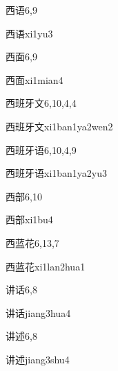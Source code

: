 \begin{entry}{西语}{6,9}
  \begin{phonetics}{西语}{xi1yu3}
  \end{phonetics}
\end{entry}

\begin{entry}{西面}{6,9}
  \begin{phonetics}{西面}{xi1mian4}
  \end{phonetics}
\end{entry}

\begin{entry}{西班牙文}{6,10,4,4}
  \begin{phonetics}{西班牙文}{xi1ban1ya2wen2}
  \end{phonetics}
\end{entry}

\begin{entry}{西班牙语}{6,10,4,9}
  \begin{phonetics}{西班牙语}{xi1ban1ya2yu3}
  \end{phonetics}
\end{entry}

\begin{entry}{西部}{6,10}
  \begin{phonetics}{西部}{xi1bu4}
  \end{phonetics}
\end{entry}

\begin{entry}{西蓝花}{6,13,7}
  \begin{phonetics}{西蓝花}{xi1lan2hua1}
  \end{phonetics}
\end{entry}

\begin{entry}{讲话}{6,8}
  \begin{phonetics}{讲话}{jiang3hua4}
  \end{phonetics}
\end{entry}

\begin{entry}{讲述}{6,8}
  \begin{phonetics}{讲述}{jiang3shu4}
  \end{phonetics}
\end{entry}

